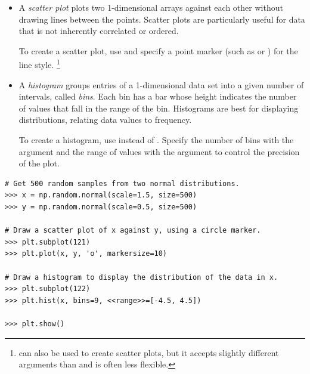 \begin{itemize}
\item A \emph{scatter plot} plots two 1-dimensional arrays against each other without drawing lines between the points.
Scatter plots are particularly useful for data that is not inherently correlated or ordered.

To create a scatter plot, use  and specify a point marker (such as  or ) for the line style.%
\footnote{ can also be used to create scatter plots, but it accepts slightly different arguments than  and is often less flexible.}

\item A \emph{histogram} groups entries of a 1-dimensional data set into a given number of intervals, called \emph{bins}.
Each bin has a bar whose height indicates the number of values that fall in the range of the bin.
Histograms are best for displaying distributions, relating data values to frequency.

To create a histogram, use  instead of .
Specify the number of bins with the argument  and the range of values with the argument  to control the precision of the plot.
\end{itemize}

\begin{lstlisting}
# Get 500 random samples from two normal distributions.
>>> x = np.random.normal(scale=1.5, size=500)
>>> y = np.random.normal(scale=0.5, size=500)

# Draw a scatter plot of x against y, using a circle marker.
>>> plt.subplot(121)
>>> plt.plot(x, y, 'o', markersize=10)

# Draw a histogram to display the distribution of the data in x.
>>> plt.subplot(122)
>>> plt.hist(x, bins=9, <<range>>=[-4.5, 4.5])

>>> plt.show()
\end{lstlisting}

